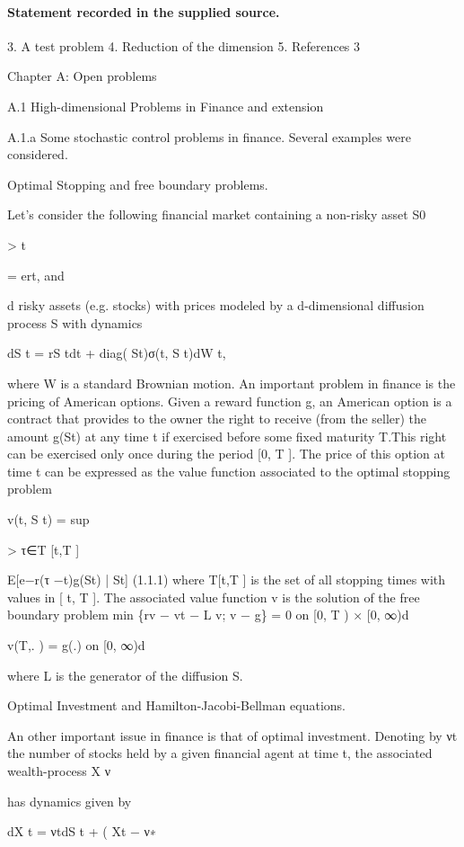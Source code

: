\documentclass[11pt]{article}
\begin{document}
\paragraph{Statement recorded in the supplied source.}
3. A test problem 4. Reduction of the dimension 5. References 3

Chapter A: Open problems

A.1 High-dimensional Problems in Finance and extension

A.1.a Some stochastic control problems in finance. Several examples were considered.

Optimal Stopping and free boundary problems.

Let's consider the following financial market containing a non-risky asset S0

> t

= ert, and

d risky assets (e.g. stocks) with prices modeled by a d-dimensional diffusion process S with dynamics

dS t = rS tdt + diag( St)σ(t, S t)dW t,

where W is a standard Brownian motion. An important problem in finance is the pricing of American options. Given a reward function g, an American option is a contract that provides to the owner the right to receive (from the seller) the amount g(St) at any time t if exercised before some fixed maturity T.This right can be exercised only once during the period [0, T ]. The price of this option at time t can be expressed as the value function associated to the optimal stopping problem

v(t, S t) = sup

> τ∈T [t,T ]

E[e−r(τ −t)g(St) | St] (1.1.1) where T[t,T ] is the set of all stopping times with values in [ t, T ]. The associated value function v is the solution of the free boundary problem min \{rv − vt − L v; v − g\} = 0 on [0, T ) × [0, ∞)d

v(T,. ) = g(.) on [0, ∞)d

where L is the generator of the diffusion S.

Optimal Investment and Hamilton-Jacobi-Bellman equations.

An other important issue in finance is that of optimal investment. Denoting by νt the number of stocks held by a given financial agent at time t, the associated wealth-process X ν

has dynamics given by

dX t = νtdS t + ( Xt − ν∗
\end{document}
